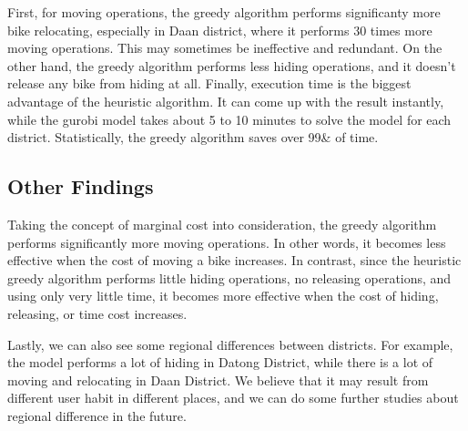 \documentclass[11pt,a4paper]{article}
\begin{document}
First, for moving operations, the greedy algorithm performs significanty more bike relocating, especially in Daan district, where it performs 30 times more moving operations. This may sometimes be ineffective and redundant.
On the other hand, the greedy algorithm performs less hiding operations, and it doesn't release any bike from hiding at all.
Finally, execution time is the biggest advantage of the heuristic algorithm. It can come up with the result instantly, while the gurobi model takes about 5 to 10 minutes to solve the model for each district. Statistically, the greedy algorithm saves over 99& of time.

\subsection*{Other Findings}

Taking the concept of marginal cost into consideration, the greedy algorithm performs significantly more moving operations. In other words, it becomes less effective when the cost of moving a bike increases.
In contrast, since the heuristic greedy algorithm performs little hiding operations, no releasing operations, and using only very little time, it becomes more effective when the cost of hiding, releasing, or time cost increases.

Lastly, we can also see some regional differences between districts. For example, the model performs a lot of hiding in Datong District, while there is a lot of moving and relocating in Daan District. We believe that it may result from different user habit in different places, and we can do some further studies about regional difference in the future.


\vspace{0.5em}
\end{document}
